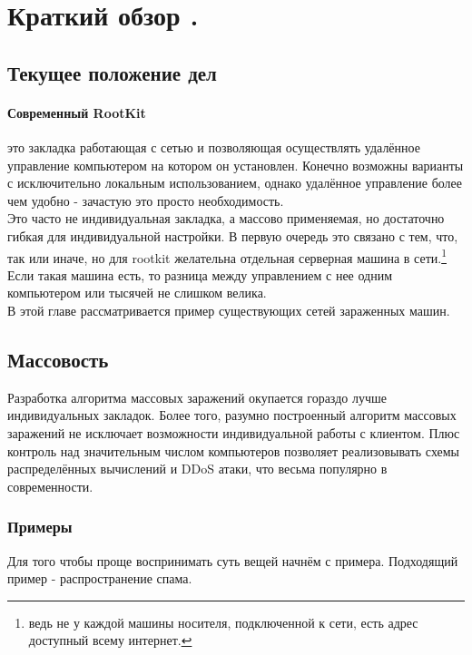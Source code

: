 
\section{Краткий обзор .}

\subsection{Текущее положение дел}

\paragraph{Современный RootKit}
 это закладка работающая с сетью и позволяющая осуществлять удалённое
управление компьютером на котором он установлен. Конечно возможны
варианты с исключительно локальным использованием, однако удалённое
управление более чем удобно - зачастую это просто необходимость.\\

Это часто не индивидуальная закладка, а  массово применяемая, но
достаточно гибкая для индивидуальной настройки. В первую очередь это
связано с тем,  что, так или иначе, но для rootkit желательна
отдельная серверная машина в сети.\footnote{ведь не у каждой
машины носителя, подключенной к сети, есть адрес доступный всему
интернет.}  Если такая машина есть, то разница между управлением с нее
одним компьютером или тысячей не слишком велика.\\

В этой главе рассматривается пример существующих сетей
зараженных машин.

\subsection{Массовость}
Разработка алгоритма массовых заражений окупается гораздо лучше
индивидуальных закладок. Более того, разумно построенный алгоритм
массовых заражений не исключает возможности индивидуальной работы с
клиентом. Плюс контроль над значительным числом компьютеров позволяет
реализовывать схемы распределённых вычислений  и DDoS атаки, что весьма
популярно в современности.


\subsubsection{Примеры}

Для того чтобы проще воспринимать суть вещей начнём с примера.
Подходящий пример - распространение спама.

